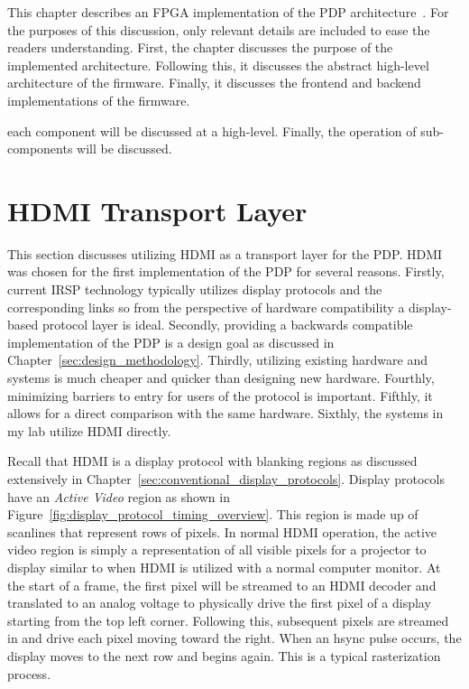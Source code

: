 \label{chap:implementation}

This chapter describes an FPGA implementation of the PDP architecture~\cite{LandwehrEtAl2019_2,JacksonEtAl2019,BrowningEtAl2020}. For the purposes of this discussion, only relevant details are included to ease the readers understanding. First, the chapter discusses the purpose of the implemented architecture. Following this, it discusses the abstract high-level architecture of the firmware. Finally, it discusses the frontend and backend implementations of the firmware.

each component will be discussed at a high-level. Finally, the operation of sub-components will be discussed.

\section{HDMI Transport Layer}
    \label{sec:hdmi_transport_layer}

    This section discusses utilizing HDMI as a transport layer for the PDP. HDMI was chosen for the first implementation of the PDP for several reasons. Firstly, current IRSP technology typically utilizes display protocols and the corresponding links so from the perspective of hardware compatibility a display-based protocol layer is ideal. Secondly, providing a backwards compatible implementation of the PDP is a design goal as discussed in Chapter~\ref{sec:design_methodology}. Thirdly, utilizing existing hardware and systems is much cheaper and quicker than designing new hardware. Fourthly, minimizing barriers to entry for users of the protocol is important. Fifthly, it allows for a direct comparison with the same hardware. Sixthly, the systems in my lab utilize HDMI directly.

    Recall that HDMI is a display protocol with blanking regions as discussed extensively in Chapter~\ref{sec:conventional_display_protocols}. Display protocols have an {\it Active Video} region as shown in Figure~\ref{fig:display_protocol_timing_overview}. This region is made up of scanlines that represent rows of pixels. In normal HDMI operation, the active video region is simply a representation of all visible pixels for a projector to display similar to when HDMI is utilized with a normal computer monitor. At the start of a frame, the first pixel will be streamed to an HDMI decoder and translated to an analog voltage to physically drive the first pixel of a display starting from the top left corner. Following this, subsequent pixels are streamed in and drive each pixel moving toward the right. When an hsync pulse occurs, the display moves to the next row and begins again. This is a typical rasterization process.

